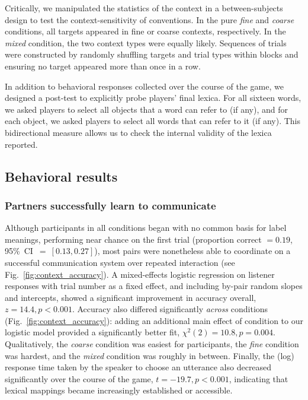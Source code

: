 Critically, we manipulated the statistics of the context in a between-subjects design to test the context-sensitivity of conventions. 
In the pure \emph{fine} and \emph{coarse} conditions, all targets appeared in fine or coarse contexts, respectively.
In the \emph{mixed} condition, the two context types were equally likely. 
Sequences of trials were constructed by randomly shuffling targets and trial types within blocks and ensuring no target appeared more than once in a row. 

In addition to behavioral responses collected over the course of the game, we designed a post-test to explicitly probe players' final lexica. For all sixteen words, we asked players to select all objects that a word can refer to (if any), and for each object, we asked players to select all words that can refer to it (if any). 
This bidirectional measure allows us to check the internal validity of the lexica reported.

\subsection{Behavioral results}

\subsubsection{Partners successfully learn to communicate}

Although participants in all conditions began with no common basis for label meanings, performing near chance on the first trial (proportion correct $= 0.19$, 95\%~CI~$=~[0.13, 0.27]$), most pairs were nonetheless able to coordinate on a successful communication system over repeated interaction (see Fig.\ \ref{fig:context_accuracy}). 
A mixed-effects logistic regression on listener responses with trial number as a fixed effect, and including by-pair random slopes and intercepts, showed a significant improvement in accuracy overall, $z = 14.4, p < 0.001$. 
Accuracy also differed significantly \emph{across} conditions (Fig.\ \ref{fig:context_accuracy}): adding an additional main effect of condition to our logistic model provided a significantly better fit, $\chi^2(2) = 10.8, p = 0.004$. 
Qualitatively, the \emph{coarse} condition was easiest for participants, the \emph{fine} condition was hardest, and the \emph{mixed} condition was roughly in between. %
Finally, the (log) response time taken by the speaker to choose an utterance also decreased significantly over the course of the game, $t = -19.7, p < 0.001$, indicating that lexical mappings became increasingly established or accessible.

